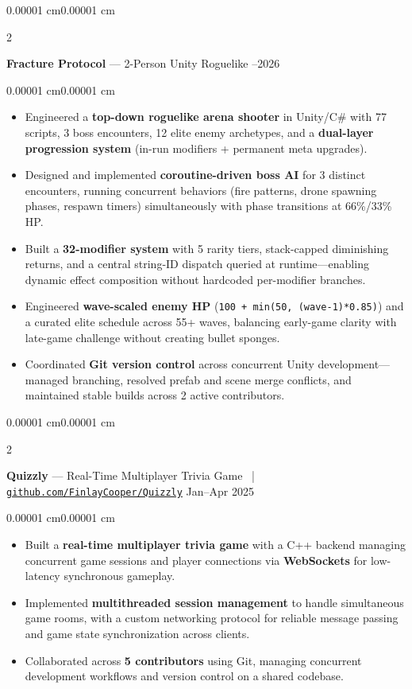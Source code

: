 \documentclass[10pt, letterpaper]{article}
\newenvironment{highlights}{
    \begin{itemize}[
        topsep=0.08 cm,
        parsep=0.06 cm,
        partopsep=0pt,
        itemsep=0pt,
        leftmargin=10pt
    ]
}{
    \end{itemize}
}
\newenvironment{onecolentry}{
    \begin{adjustwidth}{0.00001 cm}{0.00001 cm}
}{
    \end{adjustwidth}
}
\newenvironment{twocolentry}[2][3.6cm]{%
    \onecolentry
    \def\secondColumn{#2}%
    \setcolumnwidth{\fill, #1}%
    \begin{paracol}{2}%
}{%
    \switchcolumn \raggedleft \secondColumn
    \end{paracol}
    \endonecolentry
}
\begin{document}
\begin{twocolentry}{
    2025--2026
}
    \textbf{Fracture Protocol} --- 2-Person Unity Roguelike
\end{twocolentry}
\vspace{0.08 cm}
\begin{onecolentry}
    \begin{highlights}
        \item Engineered a \textbf{top-down roguelike arena shooter} in Unity/C\# with 77 scripts, 3 boss encounters, 12 elite enemy archetypes, and a \textbf{dual-layer progression system} (in-run modifiers + permanent meta upgrades).
        \item Designed and implemented \textbf{coroutine-driven boss AI} for 3 distinct encounters, running concurrent behaviors (fire patterns, drone spawning phases, respawn timers) simultaneously with phase transitions at 66\%/33\% HP.
        \item Built a \textbf{32-modifier system} with 5 rarity tiers, stack-capped diminishing returns, and a central string-ID dispatch queried at runtime---enabling dynamic effect composition without hardcoded per-modifier branches.
        \item Engineered \textbf{wave-scaled enemy HP} (\texttt{100 + min(50, (wave-1)*0.85)}) and a curated elite schedule across 55+ waves, balancing early-game clarity with late-game challenge without creating bullet sponges.
        \item Coordinated \textbf{Git version control} across concurrent Unity development---managed branching, resolved prefab and scene merge conflicts, and maintained stable builds across 2 active contributors.
    \end{highlights}
\end{onecolentry}

\vspace{0.16 cm}

\begin{twocolentry}{
    Jan--Apr 2025
}
    \textbf{Quizzly} --- Real-Time Multiplayer Trivia Game ~|~
    \href{https://github.com/FinlayCooper/Quizzly}{\mbox{\nolinkurl{github.com/FinlayCooper/Quizzly}}}
\end{twocolentry}
\vspace{0.08 cm}
\begin{onecolentry}
    \begin{highlights}
        \item Built a \textbf{real-time multiplayer trivia game} with a C++ backend managing concurrent game sessions and player connections via \textbf{WebSockets} for low-latency synchronous gameplay.
        \item Implemented \textbf{multithreaded session management} to handle simultaneous game rooms, with a custom networking protocol for reliable message passing and game state synchronization across clients.
        \item Collaborated across \textbf{5 contributors} using Git, managing concurrent development workflows and version control on a shared codebase.
    \end{highlights}
\end{onecolentry}
\end{document}
